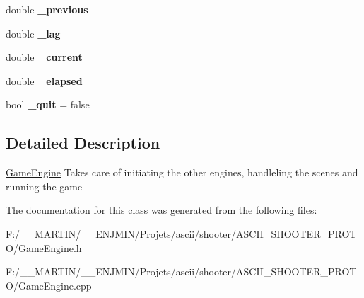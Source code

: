 \begin{DoxyCompactItemize}
double {\bfseries \+\_\+previous}
\item 
\hypertarget{class_game_engine_abe7083245b75ccd6969b54cde562167b}{}\label{class_game_engine_abe7083245b75ccd6969b54cde562167b} 
double {\bfseries \+\_\+lag}
\item 
\hypertarget{class_game_engine_a27abc89c39a79dd719084c2a9267d61d}{}\label{class_game_engine_a27abc89c39a79dd719084c2a9267d61d} 
double {\bfseries \+\_\+current}
\item 
\hypertarget{class_game_engine_a0a2ef0a08be4b7ac9f02e7db06f0bb50}{}\label{class_game_engine_a0a2ef0a08be4b7ac9f02e7db06f0bb50} 
double {\bfseries \+\_\+elapsed}
\item 
\hypertarget{class_game_engine_a6f8d9c72d09c8894b8ccbad014376285}{}\label{class_game_engine_a6f8d9c72d09c8894b8ccbad014376285} 
bool {\bfseries \+\_\+quit} = false
\end{DoxyCompactItemize}


\subsection{Detailed Description}
\hyperlink{class_game_engine}{Game\+Engine} Takes care of initiating the other engines, handleling the scenes and running the game 

The documentation for this class was generated from the following files\+:\begin{DoxyCompactItemize}
\item 
F\+:/\+\_\+\+\_\+\+M\+A\+R\+T\+I\+N/\+\_\+\+\_\+\+E\+N\+J\+M\+I\+N/\+Projets/ascii/shooter/\+A\+S\+C\+I\+I\+\_\+\+S\+H\+O\+O\+T\+E\+R\+\_\+\+P\+R\+O\+T\+O/Game\+Engine.\+h\item 
F\+:/\+\_\+\+\_\+\+M\+A\+R\+T\+I\+N/\+\_\+\+\_\+\+E\+N\+J\+M\+I\+N/\+Projets/ascii/shooter/\+A\+S\+C\+I\+I\+\_\+\+S\+H\+O\+O\+T\+E\+R\+\_\+\+P\+R\+O\+T\+O/Game\+Engine.\+cpp\end{DoxyCompactItemize}
